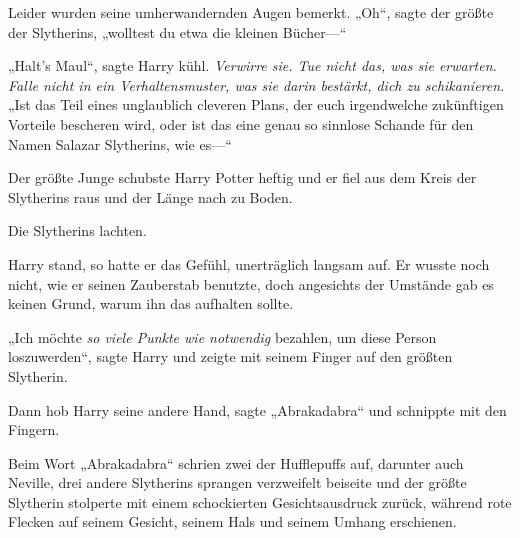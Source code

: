 Leider wurden seine umherwandernden Augen bemerkt. „Oh“, sagte der größte der Slytherins, „wolltest du etwa die kleinen Bücher—“

„Halt’s Maul“, sagte Harry kühl. \emph{Verwirre sie. Tue nicht das, was sie erwarten. Falle nicht in ein Verhaltensmuster, was sie darin bestärkt, dich zu schikanieren.} „Ist das Teil eines unglaublich cleveren Plans, der euch irgendwelche zukünftigen Vorteile bescheren wird, oder ist das eine genau so sinnlose Schande für den Namen Salazar Slytherins, wie es—“

Der größte Junge schubste Harry Potter heftig und er fiel aus dem Kreis der Slytherins raus und der Länge nach zu Boden.

Die Slytherins lachten.

Harry stand, so hatte er das Gefühl, unerträglich langsam auf. Er wusste noch nicht, wie er seinen Zauberstab benutzte, doch angesichts der Umstände gab es keinen Grund, warum ihn das aufhalten sollte.

„Ich möchte \emph{so viele Punkte wie notwendig} bezahlen, um diese Person loszuwerden“, sagte Harry und zeigte mit seinem Finger auf den größten Slytherin.

Dann hob Harry seine andere Hand, sagte „Abrakadabra“ und schnippte mit den Fingern.

Beim Wort „Abrakadabra“ schrien zwei der Hufflepuffs auf, darunter auch Neville, drei andere Slytherins sprangen verzweifelt beiseite und der größte Slytherin stolperte mit einem schockierten Gesichtsausdruck zurück, während rote Flecken auf seinem Gesicht, seinem Hals und seinem Umhang erschienen.

